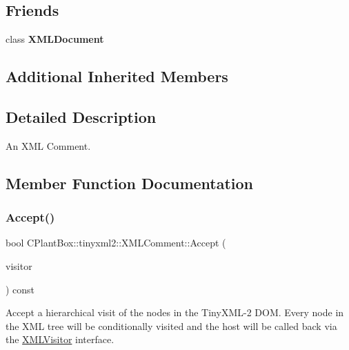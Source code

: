 \subsection*{Friends}
\begin{DoxyCompactItemize}
\item 
\mbox{\label{classCPlantBox_1_1tinyxml2_1_1XMLComment_a4eee3bda60c60a30e4e8cd4ea91c4c6e}} 
class {\bfseries X\+M\+L\+Document}
\end{DoxyCompactItemize}
\subsection*{Additional Inherited Members}


\subsection{Detailed Description}
An X\+ML Comment. 

\subsection{Member Function Documentation}
\mbox{\label{classCPlantBox_1_1tinyxml2_1_1XMLComment_a139f01ec7e0efdd01914e8d2cfd74791}} 
\subsubsection{\texorpdfstring{Accept()}{Accept()}}
{\footnotesize\ttfamily bool C\+Plant\+Box\+::tinyxml2\+::\+X\+M\+L\+Comment\+::\+Accept (\begin{DoxyParamCaption}\item[{\hyperlink{classCPlantBox_1_1tinyxml2_1_1XMLVisitor}{X\+M\+L\+Visitor} $\ast$}]{visitor }\end{DoxyParamCaption}) const\hspace{0.3cm}{\ttfamily [virtual]}}

Accept a hierarchical visit of the nodes in the Tiny\+X\+M\+L-\/2 D\+OM. Every node in the X\+ML tree will be conditionally visited and the host will be called back via the \hyperlink{classCPlantBox_1_1tinyxml2_1_1XMLVisitor}{X\+M\+L\+Visitor} interface.

